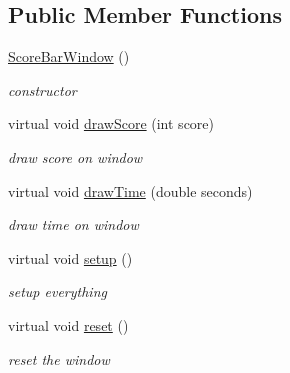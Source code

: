 \subsection*{Public Member Functions}
\begin{DoxyCompactItemize}
\item 
\hyperlink{class_n_c_t_u_1_1_score_bar_window_a1628dea2b5dc856a823064d156d93f3d}{Score\+Bar\+Window} ()\hypertarget{class_n_c_t_u_1_1_score_bar_window_a1628dea2b5dc856a823064d156d93f3d}{}\label{class_n_c_t_u_1_1_score_bar_window_a1628dea2b5dc856a823064d156d93f3d}

\begin{DoxyCompactList}\small\item\em constructor \end{DoxyCompactList}\item 
virtual void \hyperlink{class_n_c_t_u_1_1_score_bar_window_a46c5561d2aced77ed2a3c3766c2f305d}{draw\+Score} (int score)\hypertarget{class_n_c_t_u_1_1_score_bar_window_a46c5561d2aced77ed2a3c3766c2f305d}{}\label{class_n_c_t_u_1_1_score_bar_window_a46c5561d2aced77ed2a3c3766c2f305d}

\begin{DoxyCompactList}\small\item\em draw score on window \end{DoxyCompactList}\item 
virtual void \hyperlink{class_n_c_t_u_1_1_score_bar_window_a603c4e5c83e2aa2b7083d674152f3076}{draw\+Time} (double seconds)\hypertarget{class_n_c_t_u_1_1_score_bar_window_a603c4e5c83e2aa2b7083d674152f3076}{}\label{class_n_c_t_u_1_1_score_bar_window_a603c4e5c83e2aa2b7083d674152f3076}

\begin{DoxyCompactList}\small\item\em draw time on window \end{DoxyCompactList}\item 
virtual void \hyperlink{class_n_c_t_u_1_1_score_bar_window_ac20d65fe5e21a9e516c3a25e7ce4c336}{setup} ()\hypertarget{class_n_c_t_u_1_1_score_bar_window_ac20d65fe5e21a9e516c3a25e7ce4c336}{}\label{class_n_c_t_u_1_1_score_bar_window_ac20d65fe5e21a9e516c3a25e7ce4c336}

\begin{DoxyCompactList}\small\item\em setup everything \end{DoxyCompactList}\item 
virtual void \hyperlink{class_n_c_t_u_1_1_score_bar_window_a7cccdc8832be0d80efdb3907e8483aac}{reset} ()\hypertarget{class_n_c_t_u_1_1_score_bar_window_a7cccdc8832be0d80efdb3907e8483aac}{}\label{class_n_c_t_u_1_1_score_bar_window_a7cccdc8832be0d80efdb3907e8483aac}

\begin{DoxyCompactList}\small\item\em reset the window \end{DoxyCompactList}\end{DoxyCompactItemize}

